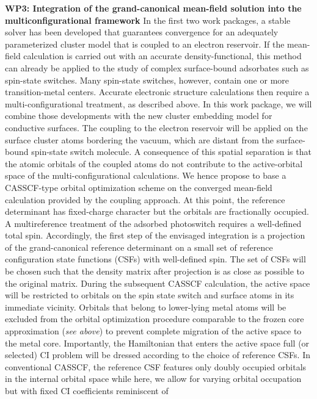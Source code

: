 \documentclass[a4paper,11pt,headings=normal]{scrartcl}
\begin{document}
\begin{itemize}
\noindent
\textbf{WP3: Integration of the grand-canonical mean-field solution into the multiconfigurational framework} 
In the first two work packages, a stable solver has been developed that 
guarantees convergence for an adequately parameterized cluster model that is 
coupled to an electron reservoir. If the mean-field calculation is carried out 
with an accurate density-functional, this method can already be applied to the 
study of complex surface-bound adsorbates such as spin-state switches. 
Many spin-state switches, however, 
contain one or more transition-metal centers. Accurate electronic 
structure calculations then require a multi-configurational treatment, as 
described above. In this work package, we will combine those developments with the 
new 
cluster embedding model for conductive surfaces. The coupling to the electron 
reservoir will be applied on the surface cluster atoms bordering the vacuum, 
which are distant from the surface-bound spin-state switch molecule. A 
consequence of this spatial separation is that the atomic orbitals of the 
coupled atoms do not contribute to the active-orbital space of the 
multi-configurational calculations. We hence propose to base a CASSCF-type 
orbital optimization scheme on the converged mean-field calculation provided by 
the coupling approach. At this point, the reference determinant has 
fixed-charge character but the orbitals are fractionally occupied.\\
A multireference treatment of the adsorbed photoswitch requires a well-defined 
total spin. Accordingly, the first step of the envisaged integration is a 
projection of the grand-canonical reference determinant on a small set of 
reference configuration state functions (CSFs) with well-defined spin. The set 
of CSFs will be chosen such that the density matrix after projection is as 
close as possible to the original matrix. During the subsequent CASSCF 
calculation, the active space will be restricted to orbitals on the spin state 
switch and surface atoms in its immediate vicinity. Orbitals 
that belong to lower-lying metal atoms will be excluded from the orbital 
optimization procedure comparable to the frozen core approximation 
(\textit{see above}) to prevent complete migration of the active space to the 
metal core. Importantly, the Hamiltonian that enters the active space full (or 
selected) CI problem will be dressed according to the choice of 
reference CSFs. In conventional CASSCF, the reference CSF features only doubly 
occupied orbitals in the internal orbital space while here, we allow for 
varying orbital occupation but with fixed CI coefficients reminiscent of 

\end{itemize}
\end{document}

